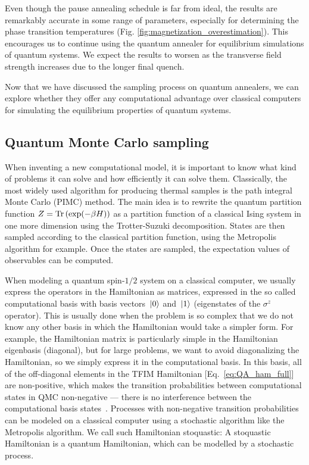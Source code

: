 \documentclass[12pt,a4paper]{article}
\begin{document}
\hspace*{0.3cm}
Even though the pause annealing schedule is far from ideal, the results are remarkably accurate in some range of parameters,
especially for determining the phase transition temperatures (Fig. \ref{fig:magnetization_overestimation}).
This encourages us to continue using the quantum annealer for equilibrium simulations of quantum systems.
We expect the results to worsen as the transverse field strength increases due to the longer final quench.

\hspace*{0.3cm}
Now that we have discussed the sampling process on quantum annealers, we can explore whether they
offer any computational advantage over classical computers for simulating the equilibrium properties
of quantum systems. 


\subsection*{Quantum Monte Carlo sampling} \label{sec:qmc}
\hspace*{0.3cm}
When inventing a new computational model, it is important to know what kind of problems it can solve and
how efficiently it can solve them. Classically, the most widely used algorithm for producing thermal
samples is the path integral Monte Carlo (PIMC) method.
The main idea is to rewrite the quantum partition function $Z = \Tr \left( \exp(-\beta H) \right)$ as a partition function
of a classical Ising system in one more dimension using the Trotter-Suzuki decomposition.
States are then sampled according to the classical partition function, using the Metropolis algorithm for example.
Once the states are sampled, the expectation values of observables can be computed.

\hspace*{0.3cm}
When modeling a quantum spin-$1/2$ system on a classical computer, we usually express the operators in the Hamiltonian
as matrices, expressed in the so called computational basis with basis vectors $\ket*{0}$ and $\ket*{1}$ (eigenstates of the
$\sigma^z$ operator). This is usually done when the problem is so complex that we do not know any other basis in
which the Hamiltonian would take a simpler form. For example, the Hamiltonian matrix is particularly simple in the Hamiltonian eigenbasis (diagonal),
but for large problems, we want to avoid diagonalizing the Hamiltonian, so we simply express it in the computational basis.
In this basis, all of the off-diagonal elements in the TFIM Hamiltonian [Eq.~\eqref{eq:QA_ham_full}] are non-positive,
which makes the transition probabilities between computational states in QMC non-negative --- there is no interference
between the computational basis states~\cite*{albash2018adiabatic}. Processes with non-negative
transition probabilities can be modeled on a classical computer using a stochastic algorithm
like the Metropolis algorithm. We call such Hamiltonian stoquastic: 
A stoquastic Hamiltonian is a quantum Hamiltonian, which can be modelled by a stochastic process.
\end{document}

